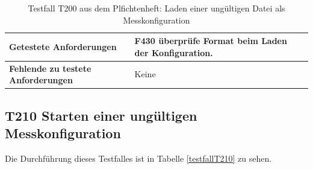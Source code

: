 \documentclass[parskip=full]{scrartcl}
\begin{document}
\begin{table}[h]
\begin{tabular}{| p{4cm} | p{10cm} |}
        
        \textbf{Getestete Anforderungen}
        & 
        \textbf{F430} überprüfe Format beim Laden der Konfiguration.
        \\ \hline
        \textbf{Fehlende zu testete Anforderungen}
        & 
        Keine
        \\ \hline
        
        
    \end{tabular}
    \caption{Testfall T200 aus dem Plfichtenheft: Laden einer ungültigen Datei als Messkonfiguration}
    \label{testfallT200}
\end{table}

\subsection{\textbf{T210} Starten einer ungültigen Messkonfiguration}

Die Durchführung dieses Testfalles ist in Tabelle \ref{testfallT210} zu sehen.
\end{document}
